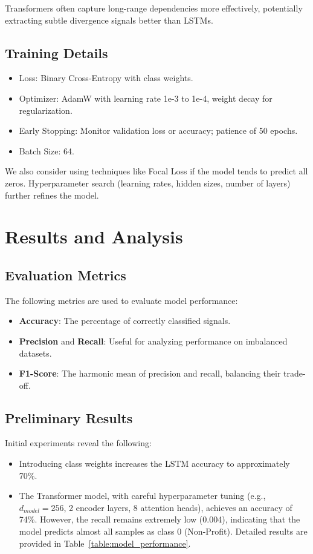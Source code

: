 \documentclass[letterpaper, 10 pt, conference]{ieeeconf}  %
\begin{document}
Transformers often capture long-range dependencies more effectively, potentially extracting subtle divergence signals better than LSTMs.

\subsection{Training Details}
\begin{itemize}
    \item Loss: Binary Cross-Entropy with class weights.
    \item Optimizer: AdamW with learning rate 1e-3 to 1e-4, weight decay for regularization.
    \item Early Stopping: Monitor validation loss or accuracy; patience of 50 epochs.
    \item Batch Size: 64.
\end{itemize}

We also consider using techniques like Focal Loss if the model tends to predict all zeros. Hyperparameter search (learning rates, hidden sizes, number of layers) further refines the model.

\section{Results and Analysis}

\subsection{Evaluation Metrics}
The following metrics are used to evaluate model performance:
\begin{itemize}
    \item \textbf{Accuracy}: The percentage of correctly classified signals.
    \item \textbf{Precision} and \textbf{Recall}: Useful for analyzing performance on imbalanced datasets.
    \item \textbf{F1-Score}: The harmonic mean of precision and recall, balancing their trade-off.
\end{itemize}

\subsection{Preliminary Results}
Initial experiments reveal the following:
\begin{itemize}
    \item Introducing class weights increases the LSTM accuracy to approximately 70\%.
    \item The Transformer model, with careful hyperparameter tuning (e.g., $d_{model}=256$, 2 encoder layers, 8 attention heads), achieves an accuracy of 74\%. However, the recall remains extremely low (0.004), indicating that the model predicts almost all samples as class 0 (Non-Profit). Detailed results are provided in Table~\ref{table:model_performance}.
\end{itemize}
\end{document}

